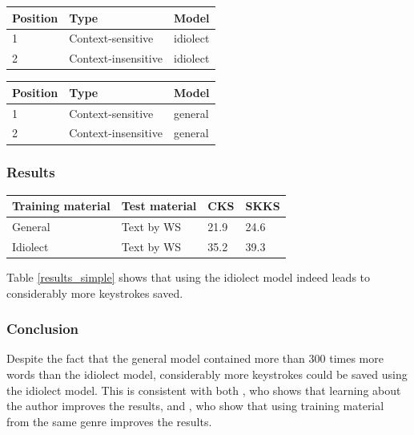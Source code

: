 \documentclass[11pt]{article}
\let\originaltable\table
\let\endoriginaltable\endtable
\renewenvironment{table}[1][ht]{%
  \originaltable[#1]
  \centering}%
  {\endoriginaltable}
\begin{document}
\begin{table}[H]
\begin{tabular}{lll} 
Position&Type&Model\\
\hline
1&Context-sensitive&idiolect\\
2&Context-insensitive&idiolect\\
\end{tabular} 
\caption{Module order for a simple idiolect simulation.} \label{idiolect_setup}  
\end{table}

\begin{table}[H]
\begin{tabular}{lll} 
Position&Type&Model\\
\hline
1&Context-sensitive&general\\
2&Context-insensitive&general\\
\end{tabular} 
\caption{Module order for a simulation for the general model.} \label{generalmodel_setup} 
\end{table}


\subsubsection{Results}

\begin{table}[H]
\begin{tabular}{ll|ll} 
Training material&Test material&CKS&SKKS\\
\hline
General &Text by WS&21.9&24.6\\
Idiolect&Text by WS&35.2&39.3\\
\end{tabular} 
\caption{Percentage of keystrokes that can be saved when using the general and the idiolect model} \label{results_simple}
\end{table}

Table \ref{results_simple} shows that  using the idiolect model indeed leads to considerably more keystrokes saved. 

\subsubsection{Conclusion}
Despite the fact that the general model contained more than 300 times more words than the idiolect model, considerably more keystrokes could be saved using the idiolect model. This is consistent with both , who shows that learning about the author improves the results, and , who show that using training material from the same genre improves the results.
\end{document}
